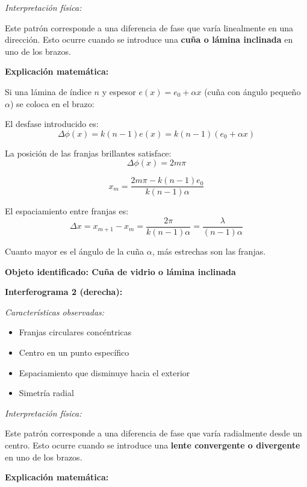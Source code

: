 \documentclass[12pt,a4paper]{article}
\begin{document}
\textit{Interpretación física:}

Este patrón corresponde a una diferencia de fase que varía linealmente en una dirección. Esto ocurre cuando se introduce una \textbf{cuña o lámina inclinada} en uno de los brazos.

\textbf{Explicación matemática:}

Si una lámina de índice $n$ y espesor $e(x) = e_0 + \alpha x$ (cuña con ángulo pequeño $\alpha$) se coloca en el brazo:

El desfase introducido es:
\begin{equation}
    \Delta\phi(x) = k(n-1)e(x) = k(n-1)(e_0 + \alpha x)
\end{equation}

La posición de las franjas brillantes satisface:
\begin{equation}
    \Delta\phi(x) = 2m\pi
\end{equation}

\begin{equation}
    x_m = \frac{2m\pi - k(n-1)e_0}{k(n-1)\alpha}
\end{equation}

El espaciamiento entre franjas es:
\begin{equation}
    \Delta x = x_{m+1} - x_m = \frac{2\pi}{k(n-1)\alpha} = \frac{\lambda}{(n-1)\alpha}
\end{equation}

Cuanto mayor es el ángulo de la cuña $\alpha$, más estrechas son las franjas.

\textbf{Objeto identificado: Cuña de vidrio o lámina inclinada}

\textbf{Interferograma 2 (derecha):}

\textit{Características observadas:}
\begin{itemize}
    \item Franjas circulares concéntricas
    \item Centro en un punto específico
    \item Espaciamiento que disminuye hacia el exterior
    \item Simetría radial
\end{itemize}

\textit{Interpretación física:}

Este patrón corresponde a una diferencia de fase que varía radialmente desde un centro. Esto ocurre cuando se introduce una \textbf{lente convergente o divergente} en uno de los brazos.

\textbf{Explicación matemática:}
\end{document}
